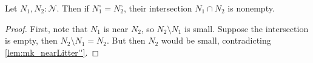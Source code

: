 \begin{lemma}
    Let \( N_1, N_2 : \mathcal N \).
    Then if \( N_1^\circ = N_2^\circ \), their intersection \( N_1 \cap N_2 \) is nonempty.
\end{lemma}
\begin{proof}
    First, note that \( N_1 \) is near \( N_2 \), so \( N_2 \setminus N_1 \) is small.
    Suppose the intersection is empty, then \( N_2 \setminus N_1 = N_2 \).
    But then \( N_2 \) would be small, contradicting \cref{lem:mk_nearLitter''}.
\end{proof}
